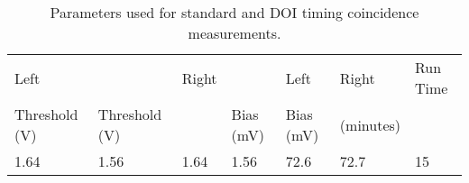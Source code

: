 \begin{table}
\caption{\label{tab:optimumparam} Parameters used for standard and DOI timing coincidence measurements.} 
\begin{tabular}{lllllll}
\hline
Left & & Right & & Left & Right & Run Time\\
Threshold (V) & Threshold (V)& & Bias (mV) & Bias (mV) & (minutes)\\
\hline
1.64&  1.56 &  1.64 &  1.56 &  72.6 &  72.7 & 15\\
\hline
\end{tabular}
\end{table}

